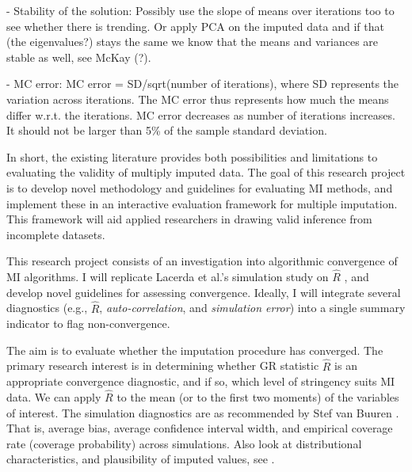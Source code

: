 \documentclass[article]{jss}
\begin{document}
- Stability of the solution: Possibly use the slope of means over iterations too to see whether there is trending. Or apply PCA on the imputed data and if that (the eigenvalues?) stays the same we know that the means and variances are stable as well, see McKay (?). 

- MC error: MC error = SD/sqrt(number of iterations), where SD represents the variation across iterations. The MC error thus represents how much the means differ w.r.t. the iterations. MC error decreases as number of iterations increases. It should not be larger than 5\% of the sample standard deviation.

In short, the existing literature provides both possibilities and limitations to evaluating the validity of multiply imputed data. The goal of this research project is to develop novel methodology and guidelines for evaluating MI methods, and implement these in an interactive evaluation framework for multiple imputation. This framework will aid applied researchers in drawing valid inference from incomplete datasets. 

This research project consists of an investigation into algorithmic convergence of MI algorithms. I will replicate Lacerda et al.'s simulation study on $\widehat{R}$ \citep{lace07}, and develop novel guidelines for assessing convergence. Ideally, I will integrate several diagnostics (e.g., $\widehat{R}$, \emph{auto-correlation}, and \emph{simulation error}) into a single summary indicator to flag non-convergence. 

The aim is to evaluate whether the imputation procedure has converged. The primary research interest is in determining whether GR statistic $\widehat{R}$ is an appropriate convergence diagnostic, and if so, which level of stringency suits MI data. We can apply $\widehat{R}$ to the mean (or to the first two moments) of the variables of interest.  The simulation diagnostics are as recommended by Stef van Buuren \cite{buur18}. That is, average bias, average confidence interval width, and empirical coverage rate (coverage probability) across simulations. Also look at distributional characteristics, and plausibility of imputed values, see \cite{vinknd}. %
\end{document}
